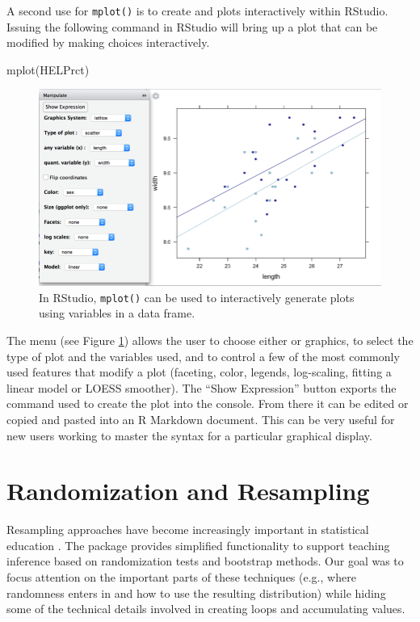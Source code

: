 A second use for \texttt{mplot()} is to create  and
 plots interactively within RStudio. Issuing the following
command in RStudio will bring up a plot that can be modified by making
choices interactively.

\begin{Schunk}
\begin{Sinput}
mplot(HELPrct)
\end{Sinput}
\end{Schunk}

\begin{figure}
\includegraphics{half-mplot.png}
\caption{In RStudio, \texttt{mplot()} can be used to interactively generate 
plots using variables in a data frame.}
\label{fig:mplot}
\end{figure}

\noindent
The menu (see Figure \ref{fig:mplot}) allows the user to choose either
 or  graphics, to select the type of plot and
the variables used, and to control a few of the most commonly used
features that modify a plot (faceting, color, legends, log-scaling,
fitting a linear model or LOESS smoother). The ``Show Expression''
button exports the command used to create the plot into the console.
From there it can be edited or copied and pasted into an R Markdown
document. This can be very useful for new users working to master the
syntax for a particular graphical display.

\section{Randomization and
Resampling}\label{randomization-and-resampling}

Resampling approaches have become increasingly important in statistical
education \citep{Tintle:TAS:2015, Hesterberg:2015}. The 
package provides simplified functionality to support teaching inference
based on randomization tests and bootstrap methods. Our goal was to
focus attention on the important parts of these techniques (e.g., where
randomness enters in and how to use the resulting distribution) while
hiding some of the technical details involved in creating loops and
accumulating values.

